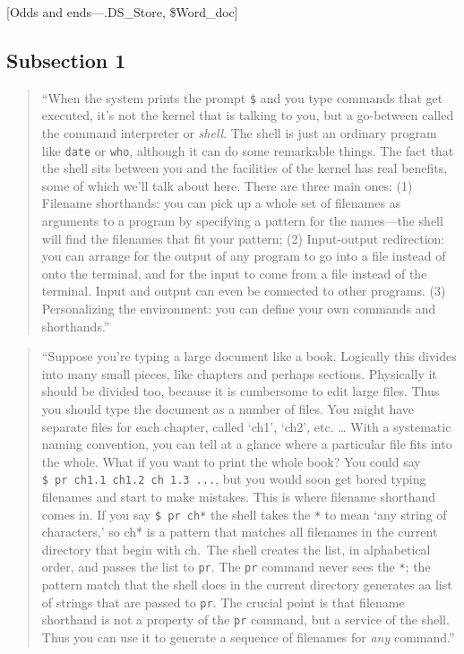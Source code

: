 \documentclass[]{tufte-book}
\begin{document}
{[}Odds and ends---.DS\_Store, \$Word\_doc{]}

\hypertarget{subsection-1-6}{%
\subsection{Subsection 1}\label{subsection-1-6}}

\begin{quote}
``When the system prints the prompt \texttt{\$} and you type commands that get
executed, it's not the kernel that is talking to you, but a go-between called
the command interpreter or \emph{shell}. The shell is just an ordinary program like
\texttt{date} or \texttt{who}, although it can do some remarkable things. The fact that the shell
sits between you and the facilities of the kernel has real benefits, some of which
we'll talk about here. There are three main ones: (1) Filename shorthands: you can
pick up a whole set of filenames as arguments to a program by specifying a
pattern for the names---the shell will find the filenames that fit your pattern;
(2) Input-output redirection: you can arrange for the output of any program to
go into a file instead of onto the terminal, and for the input to come from
a file instead of the terminal. Input and output can even be connected to
other programs. (3) Personalizing the environment: you can define your own
commands and shorthands.'' \citep{kernighan1984unix}
\end{quote}

\begin{quote}
``Suppose you're typing a large document like a book. Logically this divides into many small pieces,
like chapters and perhaps sections. Physically it should be divided too, because it is cumbersome
to edit large files. Thus you should type the document as a number of files. You might have separate
files for each chapter, called `ch1', `ch2', etc. \ldots{} With a systematic naming convention, you can tell at
a glance where a particular file fits into the whole. What if you want to print the whole book? You could
say \texttt{\$\ pr\ ch1.1\ ch1.2\ ch\ 1.3\ ...}, but you would soon get bored typing filenames and start to make mistakes.
This is where filename shorthand comes in. If you say \texttt{\$\ pr\ ch*} the shell takes the \texttt{*} to mean `any
string of characters,' so ch* is a pattern that matches all filenames in the current directory that
begin with ch.~The shell creates the list, in alphabetical order, and passes the list to \texttt{pr}. The
\texttt{pr} command never sees the \texttt{*}; the pattern match that the shell does in the current directory
generates aa list of strings that are passed to \texttt{pr}. The crucial point is that filename shorthand
is not a property of the \texttt{pr} command, but a service of the shell. Thus you can use it to generate
a sequence of filenames for \emph{any} command.'' \citep{kernighan1984unix}
\end{quote}
\end{document}
